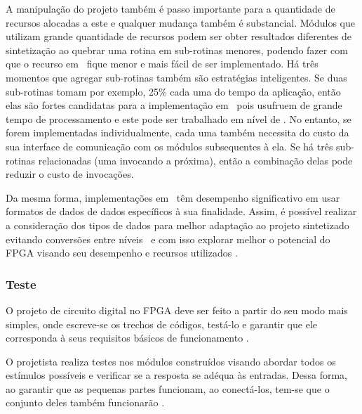         A manipulação do projeto também é passo importante para a quantidade de recursos alocadas a este e qualquer mudança também é substancial.
        Módulos que utilizam grande quantidade de recursos podem ser obter resultados diferentes de sintetização ao quebrar uma rotina em sub-rotinas menores, podendo fazer com que o recurso em \hardware\ fique menor e mais fácil de ser implementado.
        Há três momentos que agregar sub-rotinas também são estratégias inteligentes. 
        Se duas sub-rotinas tomam por exemplo, 25\% cada uma do tempo da aplicação, então elas são fortes candidatas para a implementação em \hardware\ pois usufruem de grande tempo de processamento e este pode ser trabalhado em nível de \hardware. 
        No entanto, se forem implementadas individualmente, cada uma também necessita do custo da sua interface de comunicação com os módulos subsequentes à ela. 
        Se há três sub-rotinas relacionadas (uma invocando a próxima), então a combinação delas pode reduzir o custo de invocações. 
        
        Da mesma forma, implementações em \hardware\ têm desempenho significativo em usar formatos de dados de dados específicos à sua finalidade. 
        Assim, é possível realizar a consideração dos tipos de dados para melhor adaptação ao projeto sintetizado evitando conversões entre níveis \hs\ e com isso explorar melhor o potencial do FPGA visando seu desempenho e recursos utilizados \cite{Sass2010}.
        
        
    \subsubsection{Teste}
        O projeto de circuito digital no FPGA deve ser feito a partir do seu modo mais simples, onde escreve-se os trechos de códigos, testá-lo e garantir que ele corresponda à seus requisitos básicos de funcionamento \citep{tocci2003sistemas}.
        
        O projetista realiza testes nos módulos construídos visando abordar todos os estímulos possíveis e verificar se a resposta se adéqua às entradas.
        Dessa forma, ao garantir que as pequenas partes funcionam, ao conectá-los, tem-se que o conjunto deles também funcionarão \citep{tocci2003sistemas}.
    
